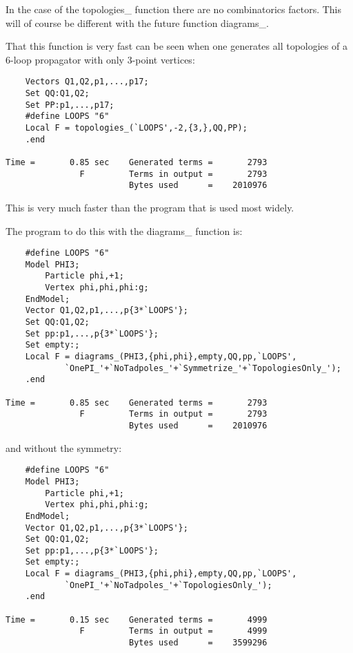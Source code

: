 In the case of the topologies\_ function there are no combinatorics 
factors. This will of course be different with the future function 
diagrams\_.

That this function is very fast can be seen when one generates all 
topologies of a 6-loop propagator with only 3-point vertices:
\begin{verbatim}
    Vectors Q1,Q2,p1,...,p17;
    Set QQ:Q1,Q2;
    Set PP:p1,...,p17;
    #define LOOPS "6"
    Local F = topologies_(`LOOPS',-2,{3,},QQ,PP);
    .end

Time =       0.85 sec    Generated terms =       2793
               F         Terms in output =       2793
                         Bytes used      =    2010976
\end{verbatim}
This is very much faster than the program that is used most widely.

The program to do this with the diagrams\_ function is:
\begin{verbatim}
    #define LOOPS "6"
    Model PHI3;
        Particle phi,+1;
        Vertex phi,phi,phi:g;
    EndModel;
    Vector Q1,Q2,p1,...,p{3*`LOOPS'};
    Set QQ:Q1,Q2;
    Set pp:p1,...,p{3*`LOOPS'};
    Set empty:;
    Local F = diagrams_(PHI3,{phi,phi},empty,QQ,pp,`LOOPS',
            `OnePI_'+`NoTadpoles_'+`Symmetrize_'+`TopologiesOnly_');
    .end

Time =       0.85 sec    Generated terms =       2793
               F         Terms in output =       2793
                         Bytes used      =    2010976
\end{verbatim}
and without the symmetry:
\begin{verbatim}
    #define LOOPS "6"
    Model PHI3;
        Particle phi,+1;
        Vertex phi,phi,phi:g;
    EndModel;
    Vector Q1,Q2,p1,...,p{3*`LOOPS'};
    Set QQ:Q1,Q2;
    Set pp:p1,...,p{3*`LOOPS'};
    Set empty:;
    Local F = diagrams_(PHI3,{phi,phi},empty,QQ,pp,`LOOPS',
            `OnePI_'+`NoTadpoles_'+`TopologiesOnly_');
    .end

Time =       0.15 sec    Generated terms =       4999
               F         Terms in output =       4999
                         Bytes used      =    3599296
\end{verbatim}
